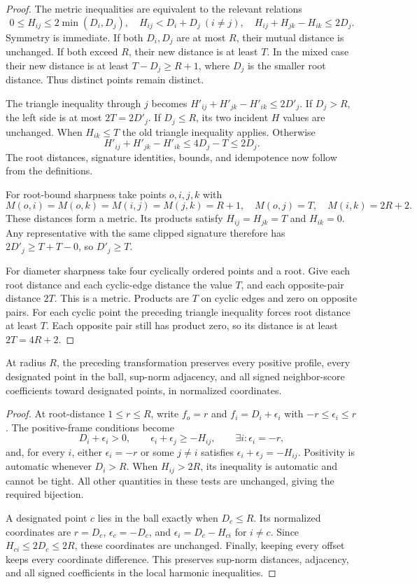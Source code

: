 \begin{proof}
The metric inequalities are equivalent to the relevant relations
\[
 0\le H_{ij}\le2\min(D_i,D_j),\quad
 H_{ij}<D_i+D_j\ (i\ne j),\quad
 H_{ij}+H_{jk}-H_{ik}\le2D_j.
\]
Symmetry is immediate. If both $D_i,D_j$ are at most $R$, their mutual
distance is unchanged. If both exceed $R$, their new distance is at least
$T$. In the mixed case their new distance is at least $T-D_j\ge R+1$,
where $D_j$ is the smaller root distance. Thus distinct points remain distinct.

The triangle inequality through $j$ becomes
$H'_{ij}+H'_{jk}-H'_{ik}\le2D'_j$. If $D_j>R$, the left side is at most
$2T=2D'_j$. If $D_j\le R$, its two incident $H$ values are unchanged. When
$H_{ik}\le T$ the old triangle inequality applies. Otherwise
\[
 H'_{ij}+H'_{jk}-H'_{ik}\le4D_j-T\le2D_j.
\]
The root distances, signature identities, bounds, and idempotence now follow
from the definitions.

For root-bound sharpness take points $o,i,j,k$ with
\[
 M(o,i)=M(o,k)=M(i,j)=M(j,k)=R+1,\quad
 M(o,j)=T,\quad M(i,k)=2R+2.
\]
These distances form a metric. Its products satisfy
$H_{ij}=H_{jk}=T$ and $H_{ik}=0$. Any representative with the same clipped
signature therefore has $2D'_j\ge T+T-0$, so $D'_j\ge T$.

For diameter sharpness take four cyclically ordered points and a root.
Give each root distance and each cyclic-edge distance the value $T$, and
each opposite-pair distance $2T$. This is a metric. Products are $T$ on
cyclic edges and zero on opposite pairs. For each cyclic point the preceding
triangle inequality forces root distance at least $T$. Each opposite pair
still has product zero, so its distance is at least $2T=4R+2$.
\end{proof}

\begin{theorem}\label{thm:rooted-frame}
At radius $R$, the preceding transformation preserves every positive profile,
every designated point in the ball, sup-norm adjacency, and all signed
neighbor-score coefficients toward designated points, in normalized
coordinates.
\end{theorem}
\begin{proof}
At root-distance $1\le r\le R$, write
$f_o=r$ and $f_i=D_i+\epsilon_i$ with $-r\le\epsilon_i\le r$.
The positive-frame conditions become
\[
 D_i+\epsilon_i>0,\qquad \epsilon_i+\epsilon_j\ge-H_{ij},\qquad
 \exists i:\epsilon_i=-r,
\]
and, for every $i$, either $\epsilon_i=-r$ or some $j\ne i$ satisfies
$\epsilon_i+\epsilon_j=-H_{ij}$. Positivity is automatic whenever $D_i>R$.
When $H_{ij}>2R$, its inequality is automatic and cannot be tight. All other
quantities in these tests are unchanged, giving the required bijection.

A designated point $c$ lies in the ball exactly when $D_c\le R$. Its
normalized coordinates are $r=D_c$, $\epsilon_c=-D_c$, and
$\epsilon_i=D_c-H_{ci}$ for $i\ne c$. Since $H_{ci}\le2D_c\le2R$, these
coordinates are unchanged. Finally, keeping every offset keeps every
coordinate difference. This preserves sup-norm distances, adjacency, and
all signed coefficients in the local harmonic inequalities.
\end{proof}


